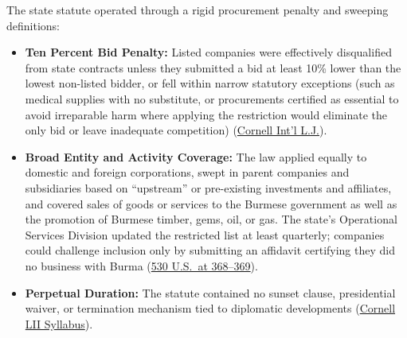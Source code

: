 \documentclass[12pt]{article}
\begin{document}
The state statute operated through a rigid procurement penalty and sweeping definitions:
\begin{itemize}
    \item \textbf{Ten Percent Bid Penalty:} Listed companies were effectively disqualified from state contracts unless they submitted a bid at least 10\% lower than the lowest non-listed bidder, or fell within narrow statutory exceptions (such as medical supplies with no substitute, or procurements certified as essential to avoid irreparable harm where applying the restriction would eliminate the only bid or leave inadequate competition) (\href{http://scholarship.law.cornell.edu/cgi/viewcontent.cgi?article=1470&context=cilj}{Cornell Int'l L.J.}).
    \item \textbf{Broad Entity and Activity Coverage:} The law applied equally to domestic and foreign corporations, swept in parent companies and subsidiaries based on ``upstream'' or pre-existing investments and affiliates, and covered sales of goods or services to the Burmese government as well as the promotion of Burmese timber, gems, oil, or gas. The state's Operational Services Division updated the restricted list at least quarterly; companies could challenge inclusion only by submitting an affidavit certifying they did no business with Burma (\href{https://supreme.justia.com/cases/federal/us/530/363/}{530 U.S.\ at 368--369}).
    \item \textbf{Perpetual Duration:} The statute contained no sunset clause, presidential waiver, or termination mechanism tied to diplomatic developments (\href{https://www.law.cornell.edu/supct/html/99-474.ZS.html}{Cornell LII Syllabus}).
\end{itemize}
\end{document}
